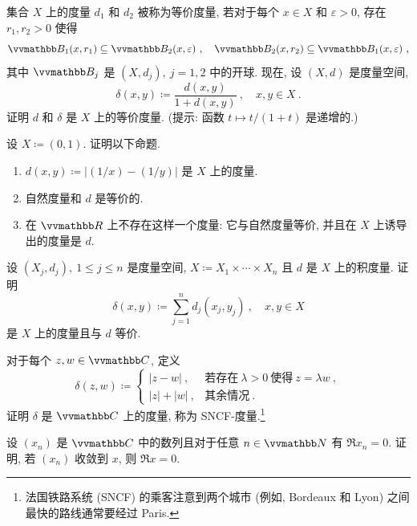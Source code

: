 \begin{exercise}[等价度量]\label{ex:equivalent-metric}
    集合 \(X\) 上的度量 \(d_1\) 和 \(d_2\) 被称为等价度量, 若对于每个 \(x \in X\) 和 \(\varepsilon > 0\), 存在 \(r_1, r_2 > 0\) 使得
    \[
        \B_1(x, r_1) \subseteq \B_2(x, \varepsilon)\ ,\quad \B_2(x, r_2) \subseteq \B_1(x, \varepsilon)\ ,
    \]
    其中 \(\B_j\) 是 \((X, d_j),\ j = 1, 2\) 中的开球. 现在, 设 \((X, d)\) 是度量空间,
    \[
        \delta(x, y) \coloneqq \frac{d(x, y)}{1 + d(x, y)}\ ,\quad x, y \in X\ .
    \]
    证明 \(d\) 和 \(\delta\) 是 \(X\) 上的等价度量. (提示: 函数 \(t \mapsto t / (1 + t)\) 是递增的.)
\end{exercise}

\begin{exercise}
    设 \(X \coloneqq (0, 1)\). 证明以下命题.
    \begin{enumerate}
        \item \(d(x, y) \coloneqq |(1 / x) - (1 / y)|\) 是 \(X\) 上的度量.
        \item 自然度量和 \(d\) 是等价的.
        \item 在 \(\R\) 上不存在这样一个度量: 它与自然度量等价, 并且在 \(X\) 上诱导出的度量是 \(d\).
    \end{enumerate}
\end{exercise}

\begin{exercise}
    设 \((X_j, d_j),\ 1 \leq j \leq n\) 是度量空间, \(X \coloneqq X_1 \times \cdots \times X_n\) 且 \(d\) 是 \(X\) 上的积度量. 证明
    \[
        \delta(x, y) \coloneqq \sum_{j = 1}^n d_j(x_j, y_j)\ ,\quad x, y \in X
    \]
    是 \(X\) 上的度量且与 \(d\) 等价.
\end{exercise}

\begin{exercise}[SNCF-度量]
    对于每个 \(z, w \in \C\), 定义
    \[
        \delta(z, w) \coloneqq
        \begin{cases}
            |z - w|\ ,   & \text{若存在}\ \lambda > 0\ \text{使得}\ z = \lambda w\ , \\
            |z| + |w|\ , & \text{其余情况}\ .
        \end{cases}
    \]
    证明 \(\delta\) 是 \(\C\) 上的度量, 称为 SNCF-度量.\footnote{法国铁路系统 (SNCF) 的乘客注意到两个城市 (例如, Bordeaux 和 Lyon) 之间最快的路线通常要经过 Paris.}
\end{exercise}

\begin{exercise}
    设 \((x_n)\) 是 \(\C\) 中的数列且对于任意 \(n \in \N\) 有 \(\Re x_n = 0\). 证明, 若 \((x_n)\) 收敛到 \(x\), 则 \(\Re x = 0\).
\end{exercise}

